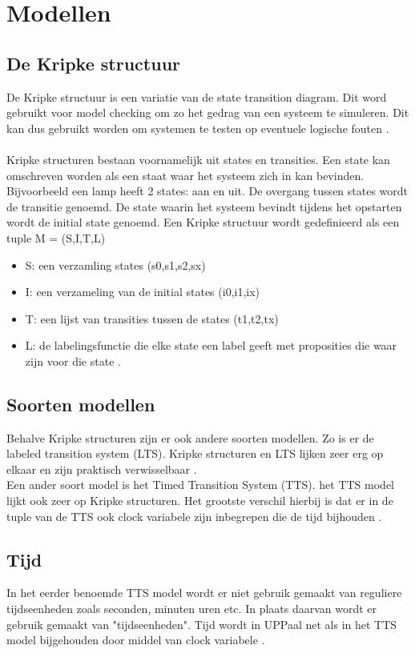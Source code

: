 \section{Modellen}

\subsection{De Kripke structuur}
De Kripke structuur is een variatie van de state transition diagram. Dit word gebruikt voor model checking om zo het gedrag van een systeem te simuleren. Dit kan dus gebruikt worden om systemen te testen op eventuele logische fouten \cite{KripkeDefinition}. \\
\\ Kripke structuren bestaan voornamelijk uit states en transities. Een state kan omschreven worden als een staat waar het systeem zich in kan bevinden. Bijvoorbeeld een lamp heeft 2 states: aan en uit. De overgang tussen states wordt de transitie genoemd. De state waarin het systeem bevindt tijdens het opstarten wordt de initial state genoemd. 
Een Kripke structuur wordt gedefinieerd als een tuple M = (S,I,T,L)
\begin{itemize}
\item  S: een verzamling states (s0,s1,s2,sx)
\item  I: een verzameling van de initial states (i0,i1,ix)
\item  T: een lijst van transities tussen de states (t1,t2,tx)
\item  L: de labelingsfunctie die elke state een label geeft met proposities die waar zijn voor die state \cite{biere1999symbolic}. 
\end{itemize}
\subsection{Soorten modellen}
Behalve Kripke structuren zijn er ook andere soorten modellen. Zo is er de labeled transition system (LTS). Kripke structuren en LTS lijken zeer erg op elkaar en zijn praktisch verwisselbaar \cite{LTS}.\\ Een ander soort model is het Timed Transition System (TTS). het TTS model lijkt ook zeer op Kripke structuren. Het grootste verschil hierbij is dat er in de tuple van de TTS ook clock variabele zijn inbegrepen die de tijd bijhouden \cite{alur1992minimization}. 
\subsection{Tijd}
In het eerder benoemde TTS model wordt er niet gebruik gemaakt van reguliere tijdseenheden zoals seconden, minuten uren etc. In plaats daarvan wordt er gebruik gemaakt van "tijdseenheden". Tijd wordt in UPPaal net als in het TTS model bijgehouden door middel van clock variabele \cite{behrmann2006tutorial}.  
